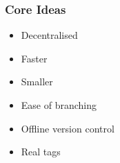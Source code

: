 \begin{frame}
\frametitle{Core Ideas}
	\begin{block}{}
	\begin{itemize}
		\item Decentralised
		\item Faster
		\item Smaller
		\item Ease of branching
		\item Offline version control
		\item Real tags
	\end{itemize}
	\end{block}
\end{frame}
